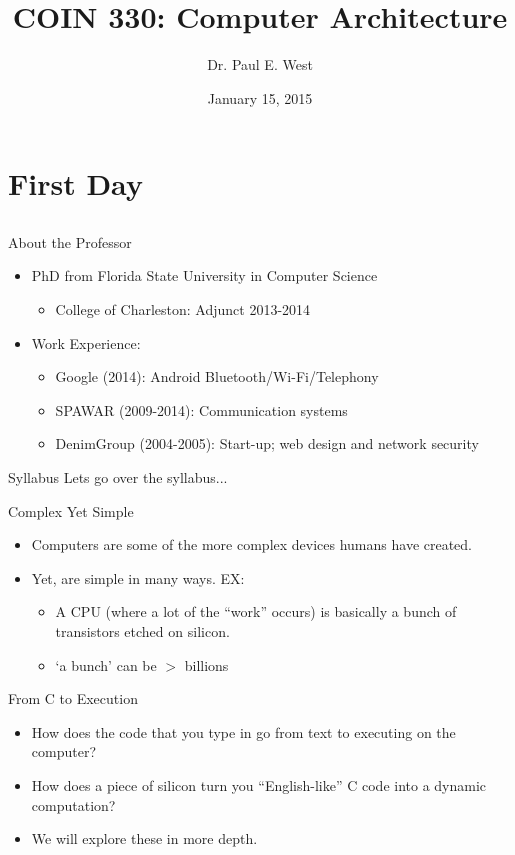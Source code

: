 \documentclass{beamer}
\title{COIN 330: Computer Architecture}
\author{Dr. Paul E. West}
\institute{
  Department of Computer Science\\
  Charleston Southern University
}
\date{January 15, 2015}
\begin{document}
\begin{frame}
  \titlepage
\end{frame}

\section{First Day}
\subsection{}
\begin{frame}{About the Professor}
\begin{itemize}
\item PhD from Florida State University in Computer Science
\begin{itemize}
\item College of Charleston: Adjunct 2013-2014
\end{itemize}
\item Work Experience:
\begin{itemize}
\item Google (2014): Android Bluetooth/Wi-Fi/Telephony
\item SPAWAR (2009-2014): Communication systems
\item DenimGroup (2004-2005): Start-up; web design and network security
\end{itemize}
\end{itemize}
\end{frame}

\begin{frame}{Syllabus}
Lets go over the syllabus...
\end{frame}

\begin{frame}{Complex Yet Simple}
\begin{itemize}
\item Computers are some of the more complex devices humans have created.
\item Yet, are simple in many ways.  EX:
\begin{itemize}
\item A CPU (where a lot of the ``work'' occurs) is basically a bunch of transistors etched on silicon.
\item `a bunch' can be $>$ billions
\end{itemize}
\end{itemize}
\end{frame}

\begin{frame}{From C to Execution}
\begin{itemize}
\item How does the code that you type in go from text to executing on the computer?
\item How does a piece of silicon turn you ``English-like'' C code into a dynamic computation?
\item We will explore these in more depth.
\end{itemize}
\end{frame}
\end{document}
